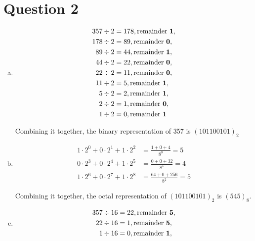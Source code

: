 \documentclass[12pt]{article}
\begin{document}
\section*{Question 2}
\begin{enumerate}[a.]
    \item
    \setcounter{equation}{0}
    \begin{align*}
        357 \div 2 &= 178, \text{remainder \textbf{1}},\\
        178 \div 2 &= 89, \text{remainder \textbf{0}},\\
        89 \div 2 &= 44, \text{remainder \textbf{1}},\\
        44 \div 2 &= 22, \text{remainder \textbf{0}},\\
        22 \div 2 &= 11, \text{remainder \textbf{0}},\\
        11 \div 2 &= 5, \text{remainder \textbf{1}},\\
        5 \div 2 &= 2, \text{remainder \textbf{1}},\\
        2 \div 2 &= 1, \text{remainder \textbf{0}},\\
        1 \div 2 &= 0, \text{remainder \textbf{1}}
    \end{align*}

    Combining it together, the binary representation of 357 is $(101100101)_2$

    \item

    \begin{align*}
        1 \cdot 2^0 + 0 \cdot 2^1 + 1 \cdot 2^2 &= \frac{1 + 0 + 4}{8^0} = 5\\
        0 \cdot 2^3 + 0 \cdot 2^4 + 1 \cdot 2^5 &= \frac{0 + 0 + 32}{8^1} = 4\\
        1 \cdot 2^6 + 0 \cdot 2^7 + 1 \cdot 2^8 &= \frac{64 + 0 + 256}{8^2} = 5
    \end{align*}

    Combining it together, the octal representation of $(101100101)_2$ is
    $(545)_8$.

    \item

    \begin{align*}
        357 \div 16 &= 22, \text{remainder \textbf{5}},\\
        22 \div 16 &= 1, \text{remainder \textbf{5}},\\
        1 \div 16 &= 0, \text{remainder \textbf{1}},\\
    \end{align*}


\end{enumerate}
\end{document}
